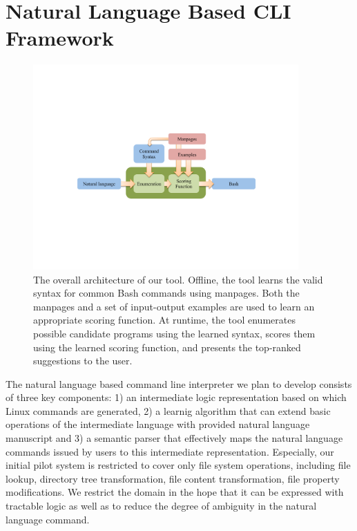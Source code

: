 
\section{Natural Language Based CLI Framework}

\begin{figure}[h]
    \begin{center} \includegraphics[width=4in]{architecture.pdf} \end{center}
    \caption{The overall architecture of our tool. Offline, the tool learns the
        valid syntax for common Bash commands using manpages. Both the manpages
        and a set of input-output examples are used to learn an appropriate
        scoring function. At runtime, the tool enumerates possible candidate
        programs using the learned syntax, scores them using the learned scoring
        function, and presents the top-ranked suggestions to the user.}
    \label{fig:arch}
\end{figure}

The natural language based command line interpreter we plan to develop consists of three key components: 1) an intermediate logic representation based on which Linux commands are generated, 2) a learnig algorithm that can extend basic operations of the intermediate language with provided natural language manuscript and 3) a semantic parser that effectively maps the natural language commands issued by users to this intermediate representation. Especially, our initial pilot system is restricted to cover only file system operations, including file lookup, directory tree transformation, file content transformation, file property modifications. We restrict the domain in the hope that it can be expressed with tractable logic as well as to reduce the degree of ambiguity in the natural language command.

